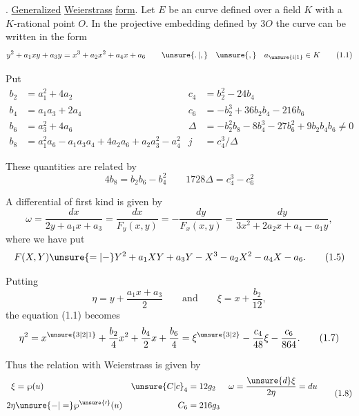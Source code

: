 \begingroup
\makeatletter\tagsleft@true{}. \uline{Generalized} \uline{Weierstrass} \uline{form}. Let $E$ be an  curve defined over a field \unsure{-} $K$ with a $K$-rational point $O$. In the projective embedding defined by $3O$ the curve can be written in the form
\[
y^2+a_1xy+a_3y=x^3+a_2x^2+a_4x+a_6
\qquad \unsure{\ldotp|,}\quad\unsure{,}\quad a_{\unsure{i|1}}\in K
\tag*{(1.1)}
\]

Put
\[
\begin{aligned}
 b_2&=a_1^2+4a_2                  & c_4&=b_2^2-24b_4\\
 b_4&=a_1a_3+2a_4                  & c_6&=-b_2^3+36b_2b_4-216b_6\\
 b_6&=a_3^2+4a_6                    & \Delta&=-b_2^2b_8-8b_4^3-27b_6^2+9b_2b_4b_6\ne0\\
 b_8&=a_1^2a_6-a_1a_3a_4+4a_2a_6+a_2a_3^2-a_4^2
                                      & j&=c_4^3/\Delta
\end{aligned}
\tag*{(1.2)}
\]

These quantities are related by
\[
4b_8=b_2b_6-b_4^2 \qquad 1728\Delta=c_4^3-c_6^2
\tag*{(1.3)}
\]

A differential of first kind is given by
\[
\omega=\frac{dx}{2y+a_1x+a_3}
=\frac{dx}{F_y(x,y)}=-\frac{dy}{F_x(x,y)}
=\frac{dy}{3x^2+2a_2x+a_4-a_1y},
\tag*{(1.4)}
\]
where we have put
\[
F(X,Y)\unsure{=|-}Y^2+a_1XY+a_3Y-X^3-a_2X^2-a_4X-a_6.
\tag*{(1.5)}
\]

Putting
\[
\eta=y+\frac{a_1x+a_3}{2}\qquad\text{and}\qquad
\xi=x+\frac{b_2}{12},
\tag*{(1.6)}
\]
the equation (1.1) becomes
\[
\eta^2=x^{\unsure{3|2|1}}+\frac{b_2}{4}x^2+\frac{b_4}{2}x+\frac{b_6}{4}
=\xi^{\unsure{3|2}}-\frac{c_4}{48}\xi-\frac{c_6}{864}.
\tag*{(1.7)}
\]

Thus the relation with Weierstrass is given by
\[
\begin{aligned}
\xi&=\wp(u) & {\unsure{C|c}}_4&=12g_2 &
\omega&=\frac{\unsure{d}\xi}{2\eta}=du\\
2\eta&\unsure{-|=}\wp^{\unsure{\prime}}(u) & C_6&=216g_3
\end{aligned}
\tag*{(1.8)}
\]
\endgroup

